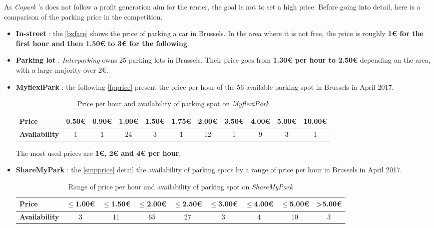 \documentclass[12pt,a4paper,oneside]{book}
\newcommand{\bp}{\textit{Copark }}
\begin{document}
As \bp's does not follow a profit generation aim for the renter, the goal is not to set a high price. Before going into detail, here is a comparison of the parking price in the competition.

\begin{itemize}
\item \textbf{In-street} : the \autoref{bxfare} shows the price of parking a car in Brussels. In the area where it is not free, the price is roughly \textbf{1\euro{} for the first hour and then 1.50\euro{} to 3\euro{} for the following}.
\item \textbf{Parking lot} : \textit{Interparking} owns 25 parking lots in Brussels. Their price goes from \textbf{1.30\euro{} per hour to 2.50\euro{}} depending on the area, with a large majority over 2\euro{}.\cite{interpk}
\item \textbf{MyflexiPark} : the following \autoref{fpprice} present the price per hour of the 56 available parking spot in Brussels in April 2017.

\begin{table}[h]
\centering
\caption{Price per hour and availability of parking spot on \textit{MyflexiPark}}
\label{fpprice}
\begin{adjustbox}{center}
\begin{tabular}{@{}lcccccccccc@{}}
\toprule
\textbf{Price}  & 0.50\euro{} & 0.90\euro{} & 1.00\euro{} & 1.50\euro{} & 1.75\euro{} & 2.00\euro{} & 3.50\euro{} & 4.00\euro{} & 5.00\euro{} & 10.00\euro{} \\ \midrule
\textbf{Availability} & 1           & 1           & 24          & 3           & 1           & 12          & 1           & 9           & 3           & 1            \\ \bottomrule
\end{tabular}
\end{adjustbox}
\end{table}

The most used prices are \textbf{1\euro{}, 2\euro{} and 4\euro{} per hour}.

\item \textbf{ShareMyPark} : the \autoref{smpprice} detail the availability of parking spots by a range of price per hour in Brussels in April 2017.

\begin{table}[h]
\centering
\caption{Range of price per hour and availability of parking spot on \textit{ShareMyPark}}
\label{smpprice}
\begin{adjustbox}{center}
\begin{tabular}{@{}lcccccccc@{}}
\toprule
\textbf{Price}       & $\leq$1.00\euro{} & $\leq$1.50\euro{} & $\leq$2.00\euro{} & $\leq$2.50\euro{} & $\leq$3.00\euro{} & $\leq$4.00\euro{} & $\leq$5.00\euro{} & >5.00\euro{} \\ \midrule
\textbf{Availability} & 3            & 11           & 65           & 27           & 3            & 4            & 10           & 3           \\\bottomrule
\end{tabular}
\end{adjustbox}
\end{table}


\end{itemize}
\end{document}
